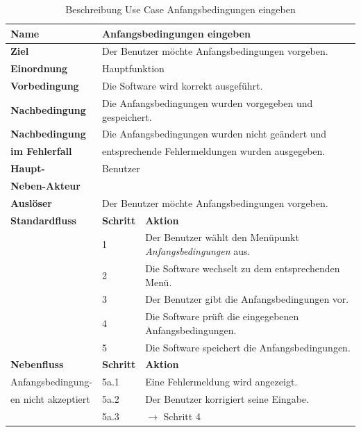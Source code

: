 \begin{table} [H]
	\centering
	\begin{tabular}{|l|l|l|}
		\hline
		\textbf{Name} 			& \multicolumn{2}{|l|}{Anfangsbedingungen eingeben}  \\
		\hline
		\textbf{Ziel} 			& \multicolumn{2}{|l|}{Der Benutzer möchte Anfangsbedingungen vorgeben. }\\ 
		\hline
		\textbf{Einordnung}		& \multicolumn{2}{|l|}{Hauptfunktion}\\
		\hline
		\textbf{Vorbedingung}	& \multicolumn{2}{|l|}{Die Software wird korrekt ausgeführt.} \\
		\hline
		\textbf{Nachbedingung}	& \multicolumn{2}{|l|}{Die Anfangsbedingungen wurden vorgegeben und gespeichert.}\\
		\hline
		\textbf{Nachbedingung} 	& \multicolumn{2}{|l|}{Die Anfangsbedingungen wurden nicht geändert und}\\
		\textbf{im Fehlerfall}	& \multicolumn{2}{|l|}{entsprechende Fehlermeldungen wurden ausgegeben.}\\
		\hline
		\textbf{Haupt-} 			& \multicolumn{2}{|l|}{Benutzer}\\
		\textbf{Neben-Akteur}	& \multicolumn{2}{|l|}{	}			\\
		\hline
		\textbf{Auslöser} 		& \multicolumn{2}{|l|}{Der Benutzer möchte Anfangsbedingungen vorgeben.} \\
		\hline 
		\textbf{Standardfluss} & \textbf{Schritt} & \textbf{Aktion} \\
		\hline
		&	1	& Der Benutzer wählt den Menüpunkt \emph{Anfangsbedingungen} aus. \\
		\cline{2-3}
		&	2	& Die Software wechselt zu dem entsprechenden Menü.\\
		\cline{2-3}
		&	3	& Der Benutzer gibt die Anfangsbedingungen vor.\\
		\cline{2-3}
		&	4	& Die Software prüft die eingegebenen Anfangsbedingungen.\\
		\cline{2-3}
		&	5	& Die Software speichert die Anfangsbedingungen.\\
		\hline
		\textbf{Nebenfluss} & \textbf{Schritt} & \textbf{Aktion}\\
		\hline
		Anfangsbedingung-  & 5a.1 & Eine Fehlermeldung wird angezeigt.\\
		\cline{2-3}
		en nicht akzeptiert 	& 5a.2	& Der Benutzer korrigiert seine Eingabe.\\
		\cline{2-3}
					& 5a.3 	& $\rightarrow$ Schritt 4\\
		\hline
	\end{tabular}
	\caption{Beschreibung Use Case Anfangsbedingungen eingeben}
	\label{Beschreibung Use Case Anfangsbedingungen eingeben}
\end{table}

